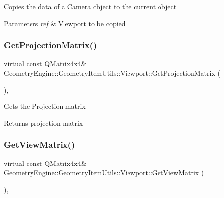 Copies the data of a Camera object to the current object 
\begin{DoxyParams}{Parameters}
{\em ref} & \mbox{\hyperlink{class_geometry_engine_1_1_geometry_item_utils_1_1_viewport}{Viewport}} to be copied \\
\hline
\end{DoxyParams}
\mbox{\label{class_geometry_engine_1_1_geometry_item_utils_1_1_viewport_a65f5f4ab19355462cb52127e7c1eb73d}} 
\subsubsection{\texorpdfstring{GetProjectionMatrix()}{GetProjectionMatrix()}}
{\footnotesize\ttfamily virtual const Q\+Matrix4x4\& Geometry\+Engine\+::\+Geometry\+Item\+Utils\+::\+Viewport\+::\+Get\+Projection\+Matrix (\begin{DoxyParamCaption}{ }\end{DoxyParamCaption})\hspace{0.3cm}{\ttfamily [inline]}, {\ttfamily [virtual]}}

Gets the Projection matrix \begin{DoxyReturn}{Returns}
projection matrix 
\end{DoxyReturn}
\mbox{\label{class_geometry_engine_1_1_geometry_item_utils_1_1_viewport_ac3c9ce922326ed25d5ffa8d3c7ffc0ca}} 
\subsubsection{\texorpdfstring{GetViewMatrix()}{GetViewMatrix()}}
{\footnotesize\ttfamily virtual const Q\+Matrix4x4\& Geometry\+Engine\+::\+Geometry\+Item\+Utils\+::\+Viewport\+::\+Get\+View\+Matrix (\begin{DoxyParamCaption}{ }\end{DoxyParamCaption})\hspace{0.3cm}{\ttfamily [inline]}, {\ttfamily [virtual]}}


